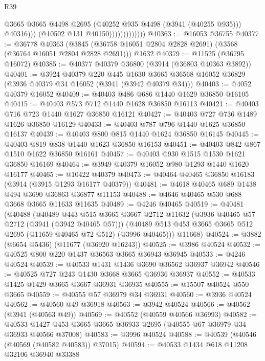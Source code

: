 \begin{lexlean}{R39}
\begin{coremodule}
                                  @3665
                                  @3665
                                  @4498
                                  @2695
                                  (@40252 @935 @4498 (@3941 (@40255 @935)))
                                  @40316)))
                            (@10502 @131 @40150)))))))))))))
@40363 := @16053 @36755
@40377 := @36778
    @40363
    (@3845 (@36758 @16051 @2804 @2828 @2691) (@3568 (@36764 @16051 @2804 @2828 @2691)))
    @1632
@40379 := @11525 (@36795 @16072)
@40385 := @40377 @40379 @36800 (@3914 (@36803 @40363 @3892))
@40401 := @3924
    @40379
    @220
    @445
    @1630
    @3665
    @36568
    @16052
    @36829
    (@3936 @40379 @34 @16052 (@3941 (@3942 @40379 @34)))
@40403 := @4052 @40379 @16052
@40409 := @40403 @486 @686 @1440 @1629 @36850 @16105
@40415 := @40403 @573 @712 @1440 @1628 @36850 @16113
@40421 := @40403 @716 @723 @1440 @1627 @36850 @16121
@40427 := @40403 @727 @736 @1489 @1626 @36850 @16129
@40433 := @40403 @787 @796 @1440 @1625 @36850 @16137
@40439 := @40403 @800 @815 @1440 @1624 @36850 @16145
@40445 := @40403 @819 @838 @1440 @1623 @36850 @16153
@40451 := @40403 @842 @867 @1510 @1622 @36850 @16161
@40457 := @40403 @930 @1515 @1530 @1621 @36850 @16169
@40464 := @3949 @40379 @16052 @980 @1293 @1440 @1620 @16177
@40465 := @10422 @40379
@40473 := @40464 @40465 @36850 @16183 (@3914 (@3915 @1293 @16177 @40379))
@40481 := @4618 @40465 @689 @1438 @494 @3690 @36863 @36877 @11153
@40488 := @4646 @40465 @530 @688 @3668 @3665 @11633 @11635
@40489 := @4246 @40465
@40519 := @40481
    (@40488
      (@40489
        @443
        @515
        @3665
        @3667
        @2712
        @11632
        (@3936 @40465 @57 @2712 (@3941 (@3942 @40465 @57)))
        (@40489 @513 @453 @3665 @3665 @512 @2695 (@11659 @40465 @72 @512) (@3996 @40465)))
      @11668)
@40524 := @3882 (@6654 @5436) (@11677 (@36920 @16243))
@40525 := @3986 @40524
@40532 := @40525 @800 @220 @1437 @36563 @3665 @36943 @36945
@40533 := @4246 @40524
@40539 := @40533 @1431 @1436 @3690 @36562 @36937 @36942
@40546 := @40525 @727 @243 @1430 @3668 @3665 @36936 @36937
@40552 := @40533 @1425 @1429 @3665 @3667 @36931 @36935
@40555 := @15507 @40524 @550 @3665
@40559 := @40555 @57 @36979 @34 @36931
@40560 := @3936 @40524
@40562 := @40560 @49 @36918
@40563 := @3942 @40524
@40566 := @40562 (@3941 (@40563 @49))
@40569 := @40552 (@40559 @40566 @36993)
@40582 := @40533 @1427 @453 @3665 @3665 @36933 @2695 (@40555 @67 @36979 @34 @36933 @40566 @37008)
@40583 := @3996 @40524
@40588 := @40539 (@40546 (@40569 (@40582 @40583)) @37015)
@40594 := @40533 @1434 @618 @11208 @32106 @36940 @33388

\end{coremodule}
\end{lexlean}
